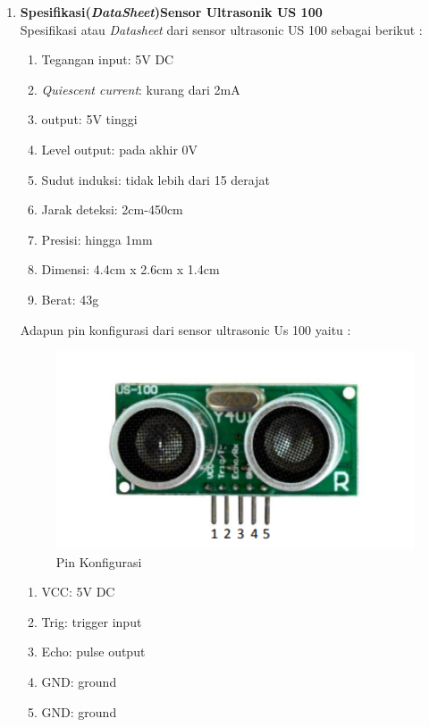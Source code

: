 \begin{enumerate}
\item  \textbf{Spesifikasi(\textit{DataSheet})Sensor Ultrasonik US 100}\\
Spesifikasi atau \textit{Datasheet} dari sensor ultrasonic US 100 sebagai berikut :\\
\begin{enumerate}
    \item Tegangan input: 5V DC
    \item \textit{Quiescent current}: kurang dari 2mA
    \item output: 5V tinggi
    \item Level output: pada akhir 0V
    \item Sudut induksi: tidak lebih dari 15 derajat
    \item Jarak deteksi: 2cm-450cm
    \item Presisi: hingga 1mm
    \item Dimensi: 4.4cm x 2.6cm x 1.4cm
    \item Berat: 43g
\end{enumerate}
Adapun pin konfigurasi dari sensor ultrasonic Us 100 yaitu :
\begin{figure}[H]
\centering
\includegraphics[width=1\textwidth]{figures/us.png}
\caption{Pin Konfigurasi}
\label{print}
\end{figure}

\begin{enumerate}
    \item VCC: 5V DC
    \item Trig: trigger input
    \item Echo: pulse output
    \item GND: ground
    \item GND: ground
\end{enumerate}


\end{enumerate}

